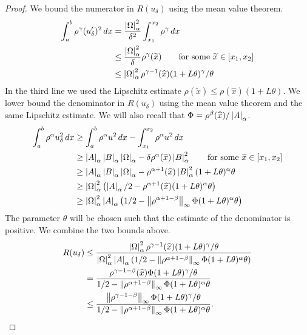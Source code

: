 \begin{proof}
We bound the numerator in $R(u_\delta)$ using the mean value theorem.
\begin{align*}
\int_a^b \rho^\gamma (u_\delta')^2\,dx  &= \frac{\left| \Omega \right|_\alpha^2}{\delta^2}\int_{x_1}^{x_2}\rho^\gamma \,dx\\
&\leq \frac{\left| \Omega \right|_\alpha^2}{\delta}\rho^\gamma(\widetilde x)\hspace{2em}\text{for some }\widetilde x \in[x_1,x_2]\\
&\leq \left| \Omega \right|_\alpha^2\rho^{\gamma-1}(\widehat x)(1+L\theta)^\gamma/\theta
\end{align*}
In the third line we used the Lipschitz estimate $\rho(\tilde x) \leq \rho(\hat x)(1+L\theta)$.
We lower bound the denominator in $R(u_\delta)$ using the mean value theorem and the same Lipschitz estimate. We will also recall that $\Phi = \rho^\beta(\widehat x)/\left| A \right|_\alpha$.
\begin{align*}
\int_a^b \rho^\alpha u_\delta^2\,dx &\geq \int_a^b \rho^\alpha u^2\,dx - \int_{x_1}^{x_2}  \rho^\alpha u^2\,dx\\
&\geq \left| A \right|_\alpha\left| B \right|_\alpha\left| \Omega \right|_\alpha - \delta\rho^\alpha(\widetilde x)\left| B \right|_\alpha^2\hspace{2em}\text{for some }\widetilde x \in[x_1,x_2]\\
&\geq \left| A \right|_\alpha\left| B \right|_\alpha\left| \Omega \right|_\alpha - \rho^{\alpha+1}(\widehat x)\left| B \right|_\alpha^2(1+L\theta)^\alpha\theta\\
&\geq \left| \Omega \right|_\alpha^2\left(\left| A \right|_\alpha/2 - \rho^{\alpha+1}(\widehat x) (1+L\theta)^\alpha \theta\right)\\
&\geq \left| \Omega \right|_\alpha^2\left| A \right|_\alpha\left(1/2 - \left\lVert \rho^{\alpha+1-\beta} \right\rVert_\infty \Phi (1+L\theta)^\alpha \theta\right)
\end{align*}
The parameter $\theta$ will be chosen such that the estimate of the denominator is positive.
We combine the two bounds above.
\begin{align*}
R(u_\delta)
&\leq \frac{\left| \Omega \right|_\alpha^2\rho^{\gamma-1}(\widehat x)(1+L\theta)^\gamma/\theta}{\left| \Omega \right|_\alpha^2\left| A \right|_\alpha\left(1/2 - \left\lVert \rho^{\alpha+1-\beta} \right\rVert_\infty \Phi (1+L\theta)^\alpha \theta\right)}\\
&= \frac{\rho^{\gamma-1-\beta}(\widehat x)\Phi(1+L\theta)^\gamma/\theta}{1/2 - \left\lVert \rho^{\alpha+1-\beta} \right\rVert_\infty \Phi (1+L\theta)^\alpha \theta}\\
&\leq \frac{\left\lVert \rho^{\gamma -1 - \beta} \right\rVert_\infty\Phi(1+L\theta)^\gamma/\theta}{1/2 -\left\lVert \rho^{\alpha + 1 - \beta} \right\rVert_\infty\Phi(1+L\theta)^\alpha\theta}.
\end{align*}


\end{proof}

